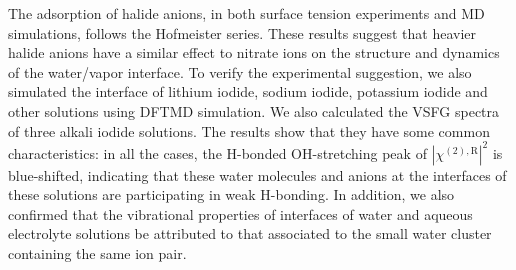 The adsorption of halide anions, in both surface tension experiments and MD simulations, 
follows the Hofmeister series\cite{PJ06,Pegram2007,ZYJ10,DT08,Parsons2011,HuaWei2013}.
These results suggest that heavier halide anions have a similar effect to nitrate ions on the structure and dynamics of the water/vapor interface. 
To verify the experimental suggestion, we also simulated the interface of lithium iodide, sodium iodide, potassium iodide 
and other solutions using DFTMD simulation.
We also calculated the VSFG spectra of three alkali iodide solutions. 
The results show that they have some common characteristics: in all the cases, 
the H-bonded OH-stretching peak of $|\chi^{(2),\text{R}}|^2$ is blue-shifted, 
indicating that these water molecules and anions at the interfaces of these solutions are participating in weak H-bonding.
In addition, we also confirmed that the vibrational properties of interfaces of water and aqueous electrolyte solutions be attributed to 
that associated to the small water cluster containing the same ion pair.

